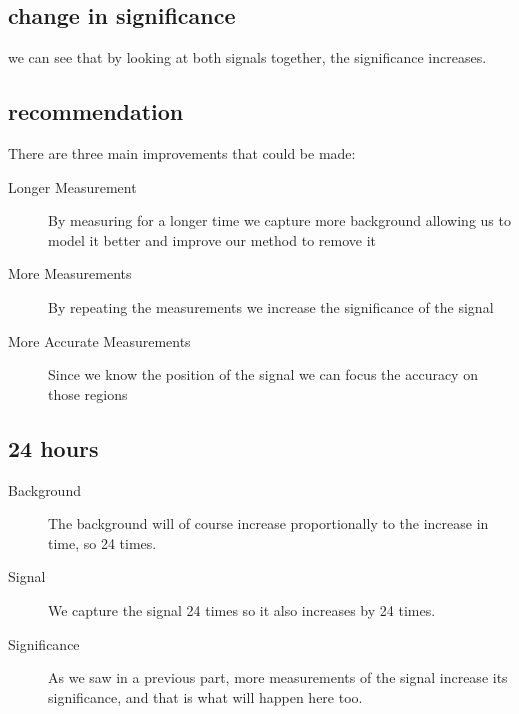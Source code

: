 \subsection{change in significance}
we can see that by looking at both signals together, the significance increases.
\subsection{recommendation}
There are three main improvements that could be made:
\begin{description}
    \item[Longer Measurement] By measuring for a longer time we capture more background allowing us to model it better and improve our method to remove it
    \item[More Measurements] By repeating the measurements we increase the significance of the signal 
    \item[More Accurate Measurements] Since we know the position of the signal we can focus the accuracy on those regions
\end{description}
\subsection{24 hours}
\begin{description}
    \item[Background] The background will of course increase proportionally to the increase in time, so 24 times.
    \item[Signal] We capture the signal 24 times so it also increases by 24 times.
    \item[Significance] As we saw in a previous part, more measurements of the signal increase its significance, and that is what will happen here too.
\end{description}